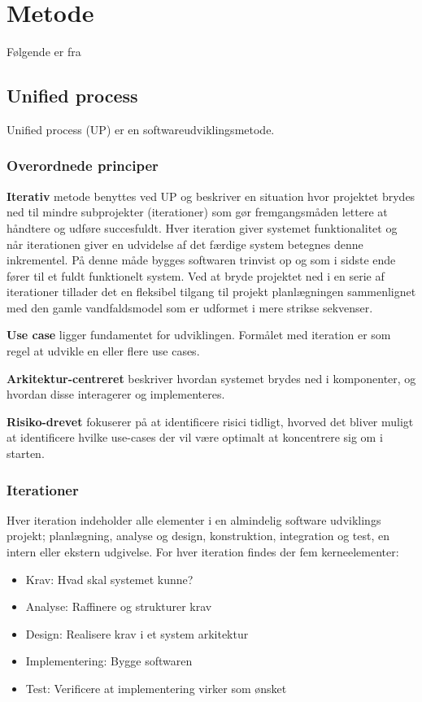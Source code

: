 \chapter{Metode}

Følgende er fra \cite{Arlow2002}
\section{Unified process}
Unified process (UP) er en softwareudviklingsmetode. 

\subsection{Overordnede principer}

\textbf{Iterativ} metode benyttes ved UP og beskriver en situation hvor projektet brydes ned til mindre subprojekter (iterationer) som gør fremgangsmåden lettere at håndtere og udføre succesfuldt. Hver iteration giver systemet funktionalitet og når iterationen giver en udvidelse af det færdige system betegnes denne inkrementel. På denne måde bygges softwaren trinvist op og som i sidste ende fører til et fuldt funktionelt system. Ved at bryde projektet ned i en serie af iterationer tillader det en fleksibel tilgang til projekt planlægningen sammenlignet med den gamle vandfaldsmodel som er udformet i mere strikse sekvenser.

\textbf{Use case} ligger fundamentet for udviklingen. Formålet med iteration er som regel at udvikle en eller flere use cases.

\textbf{Arkitektur-centreret} beskriver hvordan systemet brydes ned i komponenter, og hvordan disse interagerer og implementeres. 

\textbf{Risiko-drevet} fokuserer på at identificere risici tidligt, hvorved det bliver muligt at identificere hvilke use-cases der vil være optimalt at koncentrere sig om i starten.

\subsection{Iterationer}
Hver iteration indeholder alle elementer i en almindelig software udviklings projekt; planlægning, analyse og design, konstruktion, integration og test, en intern eller ekstern udgivelse. For hver iteration findes der fem kerneelementer:
\begin{itemize}
    \item Krav: Hvad skal systemet kunne?
    \item Analyse: Raffinere og strukturer krav
    \item Design: Realisere krav i et system arkitektur
    \item Implementering: Bygge softwaren
    \item Test: Verificere at implementering virker som ønsket 
\end{itemize}

